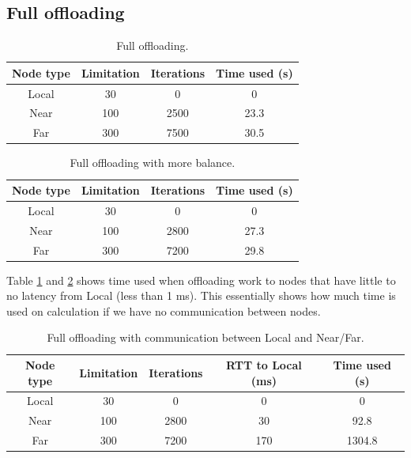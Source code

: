 \subsection{Full offloading}
\begin{table}[h!]
    \centering
    \begin{tabular}[c]{|c|c|c|c|}
        \hline
        Node type & Limitation & Iterations & Time used (s)\\
        \hline
        \hline
        Local & 30 & 0 & 0 \\
        \hline
        Near & 100 & 2500 & 23.3 \\
        \hline
        Far & 300 & 7500 & 30.5 \\
        \hline
    \end{tabular}
    \caption{Full offloading.}
    \label{tab:MEC_full_offloading}
\end{table}

\begin{table}[h!]
    \centering
    \begin{tabular}[c]{|c|c|c|c|}
        \hline
        Node type & Limitation & Iterations & Time used (s)\\
        \hline
        \hline
        Local & 30 & 0 & 0 \\
        \hline
        Near & 100 & 2800 & 27.3 \\
        \hline
        Far & 300 & 7200 & 29.8 \\
        \hline
    \end{tabular}
    \caption{Full offloading with more balance.}
    \label{tab:MEC_full_offloading_balanced}
\end{table}

Table \ref{tab:MEC_full_offloading} and \ref{tab:MEC_full_offloading_balanced} shows time used when offloading work to nodes that have little to no latency from Local (less than 1 ms). This essentially shows how much time is used on calculation if we have no communication between nodes.  

\begin{table}[h!]
    \centering
    \begin{tabular}[c]{|c|c|c|c|c|}
        \hline
        Node type & Limitation & Iterations & RTT to Local (ms)& Time used (s)\\
        \hline
        \hline
        Local & 30 & 0 & 0 & 0 \\
        \hline
        Near & 100 & 2800 & 30 & 92.8 \\
        \hline
        Far & 300 & 7200 & 170 & 1304.8 \\
        \hline
    \end{tabular}
    \caption{Full offloading with communication between Local and Near/Far.}
    \label{tab:MEC_full_offloading_latency}
\end{table}

